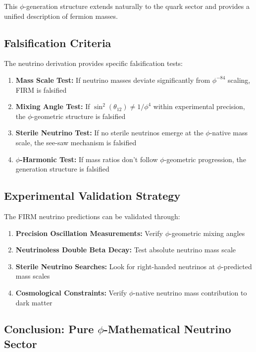 This $\phi$-generation structure extends naturally to the quark sector and provides a unified description of fermion masses.

\subsection{Falsification Criteria}

The neutrino derivation provides specific falsification tests:

\begin{enumerate}
\item \textbf{Mass Scale Test:} If neutrino masses deviate significantly from $\phi^{-84}$ scaling, FIRM is falsified
\item \textbf{Mixing Angle Test:} If $\sin^2(\theta_{12}) \neq 1/\phi^4$ within experimental precision, the $\phi$-geometric structure is falsified
\item \textbf{Sterile Neutrino Test:} If no sterile neutrinos emerge at the $\phi$-native mass scale, the see-saw mechanism is falsified
\item \textbf{$\phi$-Harmonic Test:} If mass ratios don't follow $\phi$-geometric progression, the generation structure is falsified
\end{enumerate}

\subsection{Experimental Validation Strategy}

The FIRM neutrino predictions can be validated through:

\begin{enumerate}
\item \textbf{Precision Oscillation Measurements:} Verify $\phi$-geometric mixing angles
\item \textbf{Neutrinoless Double Beta Decay:} Test absolute neutrino mass scale
\item \textbf{Sterile Neutrino Searches:} Look for right-handed neutrinos at $\phi$-predicted mass scales
\item \textbf{Cosmological Constraints:} Verify $\phi$-native neutrino mass contribution to dark matter
\end{enumerate}

\subsection{Conclusion: Pure $\phi$-Mathematical Neutrino Sector}

